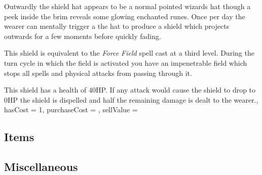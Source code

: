\documentclass[9pt,twocolumn]{article}
\begin{document}
{{Outwardly\comma{} the shield hat appears to be a normal pointed wizard\apos{}s hat\comma{} though a peek inside the brim reveals some glowing enchanted runes. Once per day\comma{} the wearer can mentally trigger a the hat to produce a shield which projects outwards for a few moments\comma{} before quickly fading. 

This shield is equivalent to the {\it Force Field} spell cast at a third level. During the turn cycle in which the field is activated\comma{} you have an impenetrable field which stops all spells and physical attacks from passing through it. 

This shield has a health of 40HP. If any attack would cause the shield to drop to 0HP\comma{} the shield is dispelled and half the remaining damage is dealt to the wearer., 
	hasCost = 1, 
	purchaseCost = , 
	sellValue = 
}

 \subsection{Items}


 \subsection{Miscellaneous}

}
\end{document}

